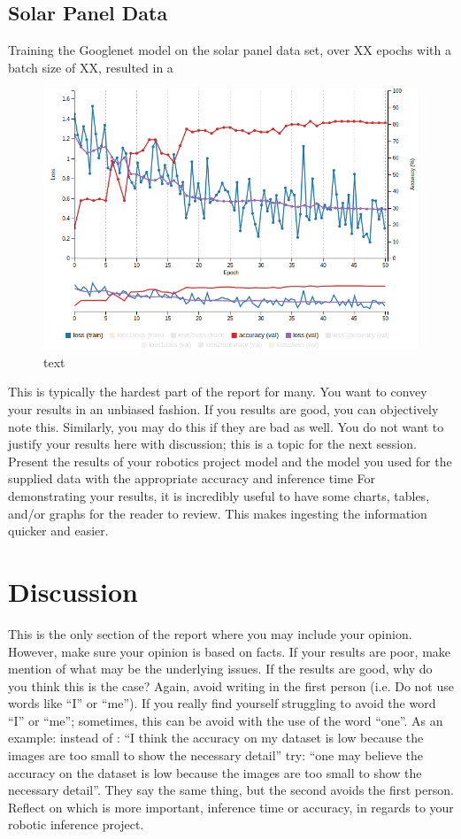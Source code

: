 \documentclass[10pt,journal,compsoc]{IEEEtran}
\begin{document}
		\subsection{Solar Panel Data}
		Training the Googlenet model on the solar panel data set, over XX epochs with a batch size of XX, resulted in a 
		\begin{figure}[h]
			\centering
			\includegraphics[scale=0.3]{googlenet_train_img}
			\caption{text}
		\end{figure}
		
		This is typically the hardest part of the report for many. You want to convey your results in an unbiased fashion. If you results are good, you can objectively note this. Similarly, you may do this if they are bad as well. You do not want to justify your results here with discussion; this is a topic for the next session. 
		Present the results of your robotics project model and the model you used for the supplied data with the appropriate accuracy and inference time
		For demonstrating your results, it is incredibly useful to have some charts, tables, and/or graphs for the reader to review. This makes ingesting the information quicker and easier.
			
		\section{Discussion}
		This is the only section of the report where you may include your opinion. However, make sure your opinion is based on facts. If your results are poor, make mention of what may be the underlying issues. If the results are good, why do you think this is the case? Again, avoid writing in the first person (i.e. Do not use words like “I” or “me”). If you really find yourself struggling to avoid the word “I” or “me”; sometimes, this can be avoid with the use of the word “one”. As an example: instead of : “I think the accuracy on my dataset is low because the images are too small to show the necessary detail” try: “one may believe the accuracy on the dataset is low because the images are too small to show the necessary detail”. They say the same thing, but the second avoids the first person. 
		Reflect on which is more important, inference time or accuracy, in regards to your robotic inference project.
			
\end{document}
